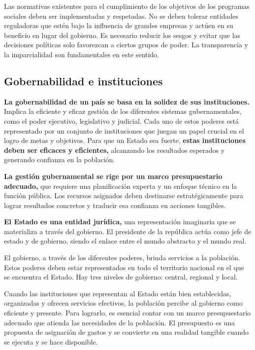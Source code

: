 \documentclass[
  jou,
  floatsintext,
  longtable,
  a4paper,
  nolmodern,
  notxfonts,
  notimes,
  12pt,
  colorlinks=true,linkcolor=blue,citecolor=blue,urlcolor=blue]{apa7}
\begin{document}
Las normativas existentes para el cumplimiento de los objetivos de los
programas sociales deben ser implementadas y respetadas. No se deben
tolerar entidades reguladoras que estén bajo la influencia de grandes
empresas y actúen en su beneficio en lugar del gobierno. Es necesario
reducir los sesgos y evitar que las decisiones políticas solo favorezcan
a ciertos grupos de poder. La transparencia y la imparcialidad son
fundamentales en este sentido.

\subsection{Gobernabilidad e
instituciones}\label{gobernabilidad-e-instituciones}

\textbf{La gobernabilidad de un país se basa en la solidez de sus
instituciones.} Implica la eficiente y eficaz gestión de los diferentes
sistemas gubernamentales, como el poder ejecutivo, legislativo y
judicial. Cada uno de estos poderes está representado por un conjunto de
instituciones que juegan un papel crucial en el logro de metas y
objetivos. Para que un Estado sea fuerte, \textbf{estas instituciones
deben ser eficaces y eficientes,} alcanzando los resultados esperados y
generando confianza en la población.

\textbf{La gestión gubernamental se rige por un marco presupuestario
adecuado,} que requiere una planificación experta y un enfoque técnico
en la función pública. Los recursos asignados deben destinarse
estratégicamente para lograr resultados concretos y traducir esa
confianza en acciones tangibles.

\textbf{El Estado es una entidad jurídica,} una representación
imaginaria que se materializa a través del gobierno. El presidente de la
república actúa como jefe de estado y de gobierno, siendo el enlace
entre el mundo abstracto y el mundo real.

El gobierno, a través de los diferentes poderes, brinda servicios a la
población. Estos poderes deben estar representados en todo el territorio
nacional en el que se encuentra el Estado. Hay tres niveles de gobierno:
central, regional y local.

Cuando las instituciones que representan al Estado están bien
establecidas, organizadas y ofrecen servicios efectivos, la población
percibe al gobierno como eficiente y presente. Para lograrlo, es
esencial contar con un marco presupuestario adecuado que atienda las
necesidades de la población. El presupuesto es una propuesta de
asignación de gastos y se convierte en una realidad tangible cuando se
ejecuta y se hace disponible.
\end{document}
